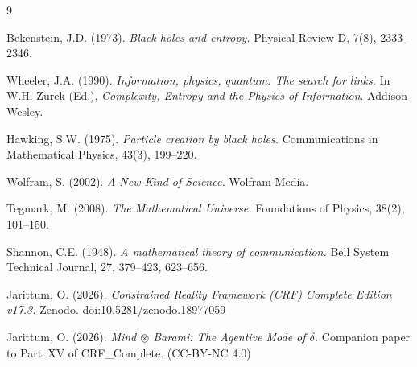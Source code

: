 \documentclass[12pt, a4paper]{article}
\begin{document}
\bigskip

\begin{thebibliography}{9}

Bekenstein, J.D. (1973).
\textit{Black holes and entropy.}
Physical Review D, 7(8), 2333--2346.

Wheeler, J.A. (1990).
\textit{Information, physics, quantum: The search for links.}
In W.H. Zurek (Ed.), \textit{Complexity, Entropy and the Physics
of Information}. Addison-Wesley.

Hawking, S.W. (1975).
\textit{Particle creation by black holes.}
Communications in Mathematical Physics, 43(3), 199--220.

Wolfram, S. (2002).
\textit{A New Kind of Science.}
Wolfram Media.

Tegmark, M. (2008).
\textit{The Mathematical Universe.}
Foundations of Physics, 38(2), 101--150.

Shannon, C.E. (1948).
\textit{A mathematical theory of communication.}
Bell System Technical Journal, 27, 379--423, 623--656.

Jarittum, O. (2026).
\textit{Constrained Reality Framework (CRF) Complete Edition v17.3.}
Zenodo. \href{https://doi.org/10.5281/zenodo.18977059}%
{doi:10.5281/zenodo.18977059}

Jarittum, O. (2026).
\textit{Mind $\otimes$ Barami: The Agentive Mode of $\delta$.}
Companion paper to Part~XV of CRF\_Complete. (CC-BY-NC 4.0)

\end{thebibliography}

\bigskip


\end{document}
